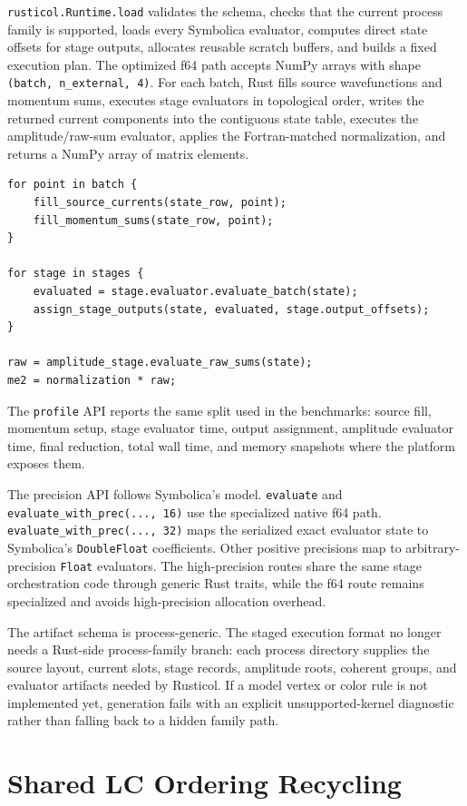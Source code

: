 \documentclass[10pt]{article}
\begin{document}
\texttt{rusticol.Runtime.load} validates the schema, checks that the current
process family is supported, loads every Symbolica evaluator, computes direct
state offsets for stage outputs, allocates reusable scratch buffers, and builds
a fixed execution plan.  The optimized f64 path accepts NumPy arrays with shape
\texttt{(batch, n\_external, 4)}.  For each batch, Rust fills source
wavefunctions and momentum sums, executes stage evaluators in topological order,
writes the returned current components into the contiguous state table, executes
the amplitude/raw-sum evaluator, applies the Fortran-matched normalization, and
returns a NumPy array of matrix elements.
\begin{lstlisting}
for point in batch {
    fill_source_currents(state_row, point);
    fill_momentum_sums(state_row, point);
}

for stage in stages {
    evaluated = stage.evaluator.evaluate_batch(state);
    assign_stage_outputs(state, evaluated, stage.output_offsets);
}

raw = amplitude_stage.evaluate_raw_sums(state);
me2 = normalization * raw;
\end{lstlisting}
The \texttt{profile} API reports the same split used in the benchmarks: source
fill, momentum setup, stage evaluator time, output assignment, amplitude
evaluator time, final reduction, total wall time, and memory snapshots where the
platform exposes them.

The precision API follows Symbolica's model.  \texttt{evaluate} and
\texttt{evaluate\_with\_prec(..., 16)} use the specialized native f64 path.
\texttt{evaluate\_with\_prec(..., 32)} maps the serialized exact evaluator state
to Symbolica's \texttt{DoubleFloat} coefficients.  Other positive precisions map
to arbitrary-precision \texttt{Float} evaluators.  The high-precision routes
share the same stage orchestration code through generic Rust traits, while the
f64 route remains specialized and avoids high-precision allocation overhead.

The artifact schema is process-generic.  The staged execution format no longer
needs a Rust-side process-family branch: each process directory supplies the
source layout, current slots, stage records, amplitude roots, coherent groups,
and evaluator artifacts needed by Rusticol.  If a model vertex or color rule is
not implemented yet, generation fails with an explicit unsupported-kernel
diagnostic rather than falling back to a hidden family path.

\section{Shared LC Ordering Recycling}
\end{document}
